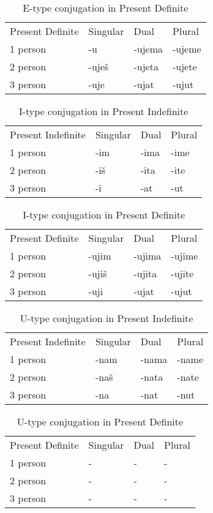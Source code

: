 \begin{table}[!htb]
	\caption{E-type conjugation in Present Definite}
	\begin{tabular}{llll}
		Present Definite & Singular & Dual & Plural \\
		1 person & -u & -ujema & -ujeme \\
		2 person & -uješ & -ujeta & -ujete \\
		3 person & -uje & -ujat & -ujut
	\end{tabular}
\end{table}


\begin{table}[!htb]
	\caption{I-type conjugation in Present Indefinite}
	\begin{tabular}{llll}
		Present Indefinite & Singular & Dual & Plural \\
		1 person & -im & -ima & -ime \\
		2 person & -iš & -ita & -ite \\
		3 person & -i & -at & -ut
	\end{tabular}
\end{table}


\begin{table}[!htb]
	\caption{I-type conjugation in Present Definite}
	\begin{tabular}{llll}
		Present Definite & Singular & Dual & Plural \\
		1 person & -ujim & -ujima & -ujime \\
		2 person & -ujiš & -ujita & -ujite \\
		3 person & -uji & -ujat & -ujut
	\end{tabular}
\end{table}


\begin{table}[!htb]
	\caption{U-type conjugation in Present Indefinite}
	\begin{tabular}{llll}
		Present Indefinite & Singular & Dual & Plural \\
		1 person & -nam & -nama & -name \\
		2 person & -naš & -nata & -nate \\
		3 person & -na & -nat & -nut
	\end{tabular}
\end{table}


\begin{table}[!htb]
	\caption{U-type conjugation in Present Definite}
	\begin{tabular}{llll}
		Present Definite & Singular & Dual & Plural \\
		1 person & - & - & - \\
		2 person & - & - & - \\
		3 person & - & - & -
	\end{tabular}
\end{table}


